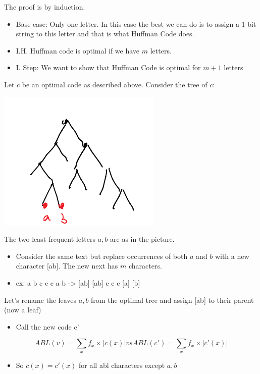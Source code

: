 \documentclass[11pt]{article}
\begin{document}
The proof is by induction.
\begin{itemize}
\item Base case: Only one letter. In this case the best we can do is to assign a 1-bit string to this letter and that is what Huffman Code does.
\item I.H. Huffman code is optimal if we have \uline{\(m\)} letters.
\item I. Step: We want to show that Huffman Code is optimal for \(m+1\) letters
\end{itemize}
Let \(c\) be an optimal code as described above. Consider the tree of \(c\):
\begin{center}
\includegraphics[width=.9\linewidth]{./Images/i67.png}
\end{center}
The two least frequent letters \(a,b\) are as in the picture.
\begin{itemize}
\item Consider the same text but replace occurrences of both \(a\) and \(b\) with a new character [ab]. The new next has \(m\) characters.
\item ex: a b c c c a b -> [ab] [ab] c c c [a] [b]
\end{itemize}
Let's rename the leaves \(a,b\) from the optimal tree and assign [ab] to their parent (now a leaf)
\begin{itemize}
\item Call the new code c'
\end{itemize}
$$ABL(v)=\sum_x f_x \times |c(x)| vs ABL(c')=\sum_x f_x \times |c'(x)|$$
\begin{itemize}
\item So \(c(x)=c'(x)\) for all abl characters except \(a,b\)
\end{itemize}
\end{document}
